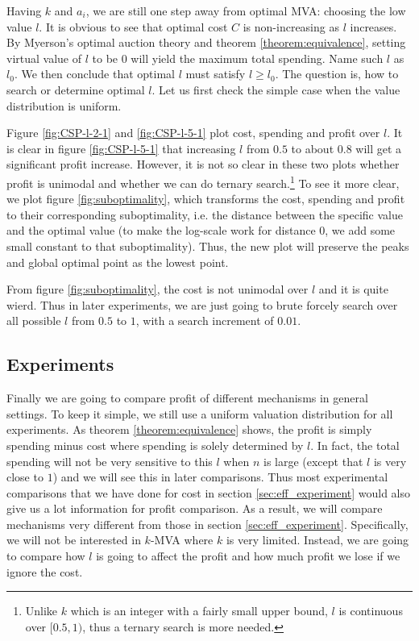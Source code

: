 Having $k$ and $a_i$, we are still one step away from optimal MVA: choosing the low
value $l$. It is obvious to see that optimal cost $C$ is non-increasing as $l$
increases. By Myerson's optimal auction theory and theorem
\ref{theorem:equivalence}, setting virtual value of $l$ to be $0$ will yield
the maximum total spending. Name such $l$ as $l_0$. We then conclude that
optimal $l$ must satisfy $l \geq l_0$. The
question is, how to search or determine optimal $l$. Let us first check the simple
case when the value distribution is uniform.

Figure \ref{fig:CSP-l-2-1} and \ref{fig:CSP-l-5-1} plot cost, spending and profit
over $l$. It is clear in figure \ref{fig:CSP-l-5-1} that increasing $l$ from $0.5$ to about $0.8$
will get a significant profit increase. However, it is not so clear in these two plots
whether profit is unimodal and whether we can do ternary search.\footnote{Unlike $k$ which is
an integer with a fairly small upper bound, $l$ is continuous over $[0.5, 1)$, 
thus a ternary search is more needed.}
To see it more clear, we plot figure \ref{fig:suboptimality},
which transforms the cost, spending and profit to their corresponding suboptimality, i.e.
the distance between the specific value and the optimal value (to make the log-scale work
for distance $0$, we add some small constant to that suboptimality). Thus, the new plot will
preserve the peaks and global optimal point as the lowest point.

From figure \ref{fig:suboptimality}, the cost is not unimodal over $l$ and it is quite wierd.
Thus in later experiments, we are just going to brute forcely search over all possible $l$ from $0.5$ to $1$,
with a search increment of $0.01$.

\subsection{Experiments}

Finally we are going to compare profit of different mechanisms in general settings.
To keep it simple, we still use a uniform valuation distribution for all
experiments.  As theorem \ref{theorem:equivalence} shows, the profit is simply
spending minus cost where spending is solely determined by $l$. In fact, the
total spending will not be very sensitive to this $l$ when $n$ is large (except
that $l$ is very close to $1$) and we will see this in later comparisons. Thus
most experimental comparisons that we have done for cost in section
\ref{sec:eff_experiment} would also give us a lot information for profit
comparison. As a result, we will compare mechanisms very different from those
in section \ref{sec:eff_experiment}. Specifically, we will not be interested in
$k$-MVA where $k$ is very limited. Instead, we are going to compare how $l$
is going to affect the profit and how much profit we lose if we ignore the cost.

